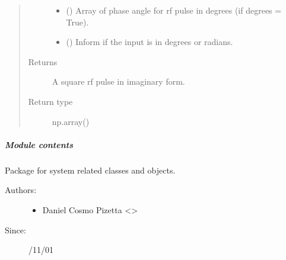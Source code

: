 \documentclass[a4paper,10pt,english]{sphinxmanual}
\begin{document}
\begin{fulllineitems}
\begin{quote}
\begin{description}
\begin{itemize}
\item {} 
 (\sphinxstyleliteralemphasis{\sphinxupquote{ {[}}}\sphinxstyleliteralemphasis{\sphinxupquote{, }}\sphinxstyleliteralemphasis{\sphinxupquote{{]}}}) \textendash{} Array of phase angle for rf pulse in degrees (if degrees = True).

\item {} 
 () \textendash{} Inform if the input is in degrees or radians.

\end{itemize}

\item[{Returns}] \leavevmode
A square rf pulse in imaginary form.

\item[{Return type}] \leavevmode
np.array()

\end{description}\end{quote}

\end{fulllineitems}



\subparagraph{Module contents}
\label{\detokenize{autodoc/mrsprint/mrsprint.system:module-mrsprint.system}}\label{\detokenize{autodoc/mrsprint/mrsprint.system:module-contents}}
Package for system related classes and objects.
\begin{description}
\item[{Authors:}] \leavevmode\begin{itemize}
\item {} 
Daniel Cosmo Pizetta \textless{}\textgreater{}

\end{itemize}

\item[{Since:}] /11/01

\end{description}
\end{document}
